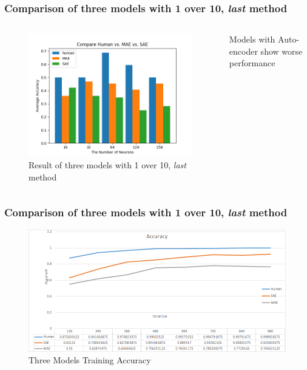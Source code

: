 \documentclass{beamer}
\begin{document}
\begin{frame}
\frametitle{Comparison of three models with 1 over 10, {\em last} method}
\begin{columns}
\begin{figure}[t!]
    \centering
    \includegraphics[width=\textwidth]{../paper/pictures/result_pictures/compare_result_last_1_10.png}
    \caption{Result of three models with 1 over 10, {\em last} method}
    \label{fig:compare_result_last_1_10}
\end{figure}

Models with Auto-encoder show worse performance
\end{columns}
\end{frame}

\begin{frame}
\frametitle{Comparison of three models with 1 over 10, {\em last} method}
\begin{figure}[t!]
    \centering
    \includegraphics[width=\textwidth]{../paper/pictures/result_pictures/three_models_comparison_accuracy.png}
    \caption{Three Models Training Accuracy}
    \label{fig:three_models_comparison_accuracy}
\end{figure}
\end{frame}
\end{document}
